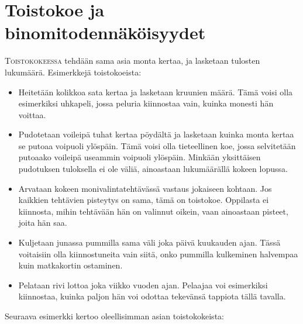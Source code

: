 \documentclass[12pt,leqno,a4paper,oneside]{amsart}
\theoremstyle{definition}
\theoremstyle{remark}
\numberwithin{equation}{section}
\begin{document}
\section{Toistokoe ja binomitodennäköisyydet}

\textsc{Toistokokeessa} tehdään sama asia monta kertaa, ja lasketaan tulosten lukumäärä. Esimerkkejä toistokoeista:
\begin{itemize}
 \item 
 Heitetään kolikkoa sata kertaa ja lasketaan kruunien määrä. Tämä voisi olla esimerkiksi uhkapeli, jossa peluria kiinnostaa vain,
 kuinka monesti hän voittaa.
 \item
 Pudotetaan voileipä tuhat kertaa pöydältä ja lasketaan kuinka monta kertaa se putoaa voipuoli ylöspäin. Tämä voisi olla tie\-teel\-li\-nen koe,
 jossa selvitetään putoaako voileipä useammin voipuoli ylöspäin. Minkään yksittäisen pudotuksen tuloksella ei ole väliä, ainoastaan lukumäärällä
 kokeen lopussa. 
 \item
 Arvataan kokeen monivalintatehtävässä vastaus jokaiseen kohtaan. Jos kaikkien tehtävien pisteytys on sama, tämä on toistokoe. Oppilasta ei
 kiinnosta, mihin tehtävään hän on valinnut oikein, vaan ainoastaan pisteet, joita hän saa. 
 \item
 Kuljetaan junassa pummilla sama väli joka päivä kuukauden ajan. Tässä voitaisiin olla kiinnostuneita vain siitä, onko pummilla kulkeminen halvempaa
 kuin matkakortin ostaminen.
 \item
 Pelataan rivi lottoa joka viikko vuoden ajan. Pelaajaa voi esimerkiksi kiinnostaa, kuinka paljon hän voi odottaa tekevänsä tappiota tällä tavalla.
\end{itemize}

Seuraava esimerkki kertoo oleellisimman asian toistokokeista:
\end{document}
